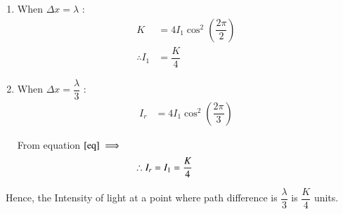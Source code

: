 \documentclass[journal,12pt,twocolumn]{IEEEtran}
\theoremstyle{remark}
\begin{document}
\begin{enumerate}[label=(\roman*)]
\item When $\Delta x = \lambda$ : 
\begin{align}
  K &= 4I_1\cos^2\left(\dfrac{2\pi}{2}\right)  \\
 \therefore I_1&=\dfrac{K}{4} \label{eq}
\end{align}
\item When $\Delta x = \dfrac{\lambda}{3}$ : 
\begin{align}
I_r &= 4I_1\cos^2\left(\dfrac{2\pi}{3}\right)   
\end{align}

From equation $ \eqref{eq} \implies$
\hspace*{0.5cm}
\begin{align}
\hspace{-1.2cm}\therefore I_r &= I_1 =\dfrac{K}{4} 
\end{align}
\end{enumerate}
\,\,\,Hence, the Intensity of light at a point where path difference is $\dfrac{\lambda}{3}$ is $\dfrac{K}{4}$ units.

\begin{table}[htbp]
\centering

\vspace{0.2cm}
\caption{ $Intensities$}
\label{tab:parameters1}
\end{table}

\end{document}
